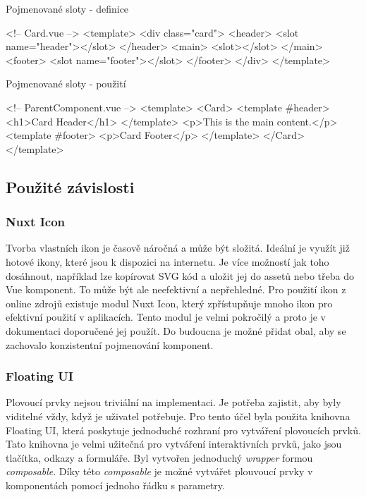 \begin{listing}[H]
    \caption{Pojmenované sloty - definice}
    \label{lst:named-slots}
    \begin{code}[jsx]
<!-- Card.vue -->
<template>
  <div class="card">
    <header>
      <slot name="header"></slot>
    </header>
    <main>
      <slot></slot>
    </main>
    <footer>
      <slot name="footer"></slot>
    </footer>
  </div>
</template>
\end{code}
\end{listing}

\begin{listing}[H]
    \caption{Pojmenované sloty - použití}
    \label{lst:named-slots}
    \begin{code}[html]
<!-- ParentComponent.vue -->
<template>
    <Card>
    <template #header>
        <h1>Card Header</h1>
    </template>
    <p>This is the main content.</p>
    <template #footer>
        <p>Card Footer</p>
    </template>
    </Card>
</template>
\end{code}
\end{listing}

\clearpage

\subsection{Použité závislosti}

\subsubsection{Nuxt Icon}
Tvorba vlastních ikon je časově náročná a může být složitá. Ideální je využít již hotové ikony, které jsou k dispozici na internetu. Je více možností jak toho dosáhnout, například lze kopírovat SVG kód a uložit jej do assetů nebo třeba do Vue komponent. To může být ale neefektivní a nepřehledné. Pro použití ikon z online zdrojů existuje modul Nuxt Icon, který zpřístupňuje mnoho ikon pro efektivní použití v aplikacích. Tento modul je velmi pokročilý a proto je v dokumentaci doporučené jej použít. Do budoucna je možné přidat obal, aby se zachovalo konzistentní pojmenování komponent.

\subsubsection{Floating UI}
Plovoucí prvky nejsou triviální na implementaci. Je potřeba zajistit, aby byly viditelné vždy, když je uživatel potřebuje. Pro tento účel byla použita knihovna Floating UI, která poskytuje jednoduché rozhraní pro vytváření plovoucích prvků. Tato knihovna je velmi užitečná pro vytváření interaktivních prvků, jako jsou tlačítka, odkazy a formuláře. Byl vytvořen jednoduchý \emph{wrapper} formou \emph{composable}. Díky této \emph{composable} je možné vytvářet plouvoucí prvky v komponentách pomocí jednoho řádku s parametry.

